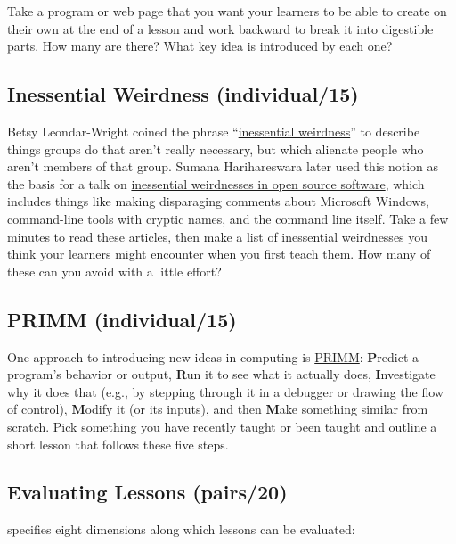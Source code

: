 Take a program or web page that you want your learners to be able to
create on their own at the end of a lesson and work backward to break it
into digestible parts. How many are there? What key idea is introduced
by each one?

\subsection*{Inessential Weirdness (individual/15)}

Betsy Leondar-Wright coined the phrase ``\href{http://www.classmatters.org/2006\_07/its-not-them.php}{inessential
weirdness}'' to describe things groups do that
aren't really necessary, but which alienate people who aren't members
of that group. Sumana Harihareswara later used this notion as the
basis for a talk on \href{https://www.harihareswara.net/sumana/2016/05/21/0}{inessential weirdnesses in open source
software}, which includes things
like making disparaging comments about Microsoft Windows, command-line
tools with cryptic names, and the command line itself. Take a few
minutes to read these articles, then make a list of inessential
weirdnesses you think your learners might encounter when you first
teach them. How many of these can you avoid with a little effort?

\subsection*{PRIMM (individual/15)}

One approach to introducing new ideas in computing is \href{http://blogs.kcl.ac.uk/cser/2017/09/01/primm-a-structured-approach-to-teaching-programming/}{PRIMM}:
\textbf{P}redict a program's behavior or output, \textbf{R}un it to see what it
actually does, \textbf{I}nvestigate why it does that (e.g., by stepping
through it in a debugger or drawing the flow of control), \textbf{M}odify
it (or its inputs), and then \textbf{M}ake something similar from scratch.
Pick something you have recently taught or been taught and outline a
short lesson that follows these five steps.

\subsection*{Evaluating Lessons (pairs/20)}

\cite{Mart2017} specifies eight dimensions along which lessons can be
evaluated:

